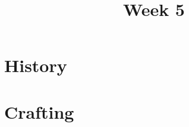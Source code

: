 \documentclass[11pt]{article}
\title{Week 5}
\date{}
\begin{document}
    \maketitle

    \section*{History}
        \begin{itemize}
        \end{itemize}

    \section*{Crafting}
        \begin{itemize}
        \end{itemize}
\end{document}
